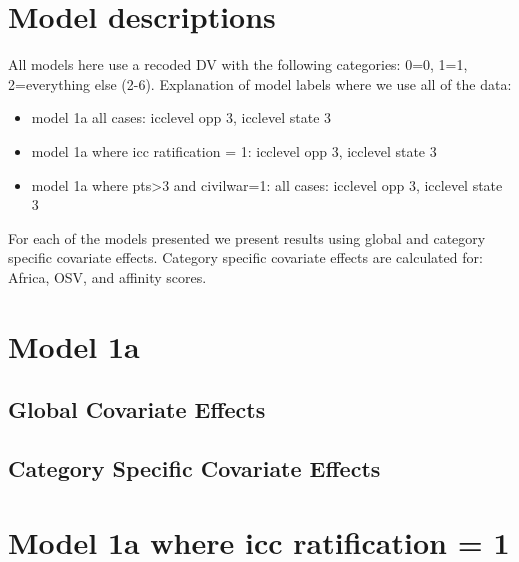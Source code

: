 \documentclass[]{article}
\begin{document}
\tableofcontents

\clearpage

\section{Model descriptions}

All models here use a recoded DV with the following categories: 0=0, 1=1, 2=everything else (2-6). Explanation of model labels where we use all of the data:

\begin{itemize}
	\item model 1a all cases: icclevel opp 3, icclevel state 3
	\item model 1a where icc ratification = 1: icclevel opp 3, icclevel state 3
	\item model 1a where pts>3 and civilwar=1: all cases: icclevel opp 3, icclevel state 3		
\end{itemize}

For each of the models presented we present results using global and category specific covariate effects. Category specific covariate effects are calculated for: Africa, OSV, and affinity scores.
\clearpage

\section{Model 1a}
\subsection{Global Covariate Effects}

\clearpage
\subsection{Category Specific Covariate Effects}

\clearpage

\section{Model 1a where icc ratification = 1}
\end{document}
